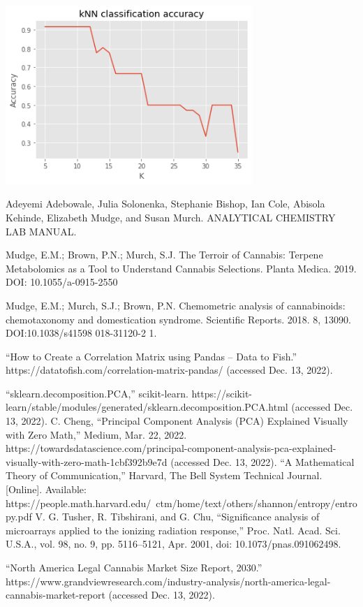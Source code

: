 \documentclass{article}
\begin{document}
\includegraphics[width=0.7\textwidth]{download.png}
\begin{thebibliography}{9}
Adeyemi Adebowale, Julia Solonenka, Stephanie Bishop, Ian Cole, Abisola Kehinde, Elizabeth Mudge, and Susan Murch. ANALYTICAL  CHEMISTRY  LAB MANUAL.

Mudge, E.M.; Brown, P.N.; Murch, S.J. The Terroir of Cannabis: Terpene Metabolomics as a Tool
 to Understand Cannabis Selections. Planta Medica. 2019. DOI: 10.1055/a-0915-2550

Mudge, E.M.; Murch, S.J.; Brown, P.N. Chemometric analysis of cannabinoids: chemotaxonomy
 and domestication syndrome. Scientific Reports. 2018. 8, 13090. DOI:10.1038/s41598
 018-31120-2 1. 

“How to Create a Correlation Matrix using Pandas – Data to Fish.” https://datatofish.com/correlation-matrix-pandas/ (accessed Dec. 13, 2022).

“sklearn.decomposition.PCA,” scikit-learn. https://scikit-learn/stable/modules/generated/sklearn.decomposition.PCA.html (accessed Dec. 13, 2022).
C. Cheng, “Principal Component Analysis (PCA) Explained Visually with Zero Math,” Medium, Mar. 22, 2022. https://towardsdatascience.com/principal-component-analysis-pca-explained-visually-with-zero-math-1cbf392b9e7d (accessed Dec. 13, 2022).
“A Mathematical Theory of Communication,” Harvard, The Bell System Technical Journal. [Online]. Available: https://people.math.harvard.edu/~ctm/home/text/others/shannon/entropy/entropy.pdf
V. G. Tusher, R. Tibshirani, and G. Chu, “Significance analysis of microarrays applied to the ionizing radiation response,” Proc. Natl. Acad. Sci. U.S.A., vol. 98, no. 9, pp. 5116–5121, Apr. 2001, doi: 10.1073/pnas.091062498.


“North America Legal Cannabis Market Size Report, 2030.” https://www.grandviewresearch.com/industry-analysis/north-america-legal-cannabis-market-report (accessed Dec. 13, 2022).

\end{thebibliography}
\end{document}
